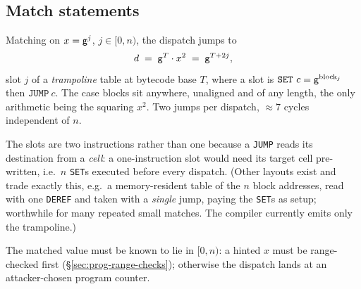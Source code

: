 \subsection{Match statements}\label{sec:prog-match}

Matching on $x=\mathsf{g}^{j}$, $j\in[0,n)$, the dispatch jumps to
\[
  d \;=\; \mathsf{g}^{T}\cdot x^{2} \;=\; \mathsf{g}^{T+2j},
\]
slot $j$ of a \emph{trampoline} table at bytecode base $T$, where a slot is $\texttt{SET}\ c=\gen^{\mathrm{block}_j}$ then $\texttt{JUMP}\ c$. The case blocks sit anywhere, unaligned and of any length, the only arithmetic being the squaring $x^{2}$. Two jumps per dispatch, $\approx7$ cycles independent of $n$.

The slots are two instructions rather than one because a \texttt{JUMP} reads its destination from a \emph{cell}: a one-instruction slot would need its target cell pre-written, i.e.\ $n$ \texttt{SET}s executed before every dispatch. (Other layouts exist and trade exactly this, e.g.\ a memory-resident table of the $n$ block addresses, read with one \texttt{DEREF} and taken with a \emph{single} jump, paying the \texttt{SET}s as setup; worthwhile for many repeated small matches. The compiler currently emits only the trampoline.)

The matched value must be known to lie in $[0,n)$: a hinted $x$ must be range-checked first (\S\ref{sec:prog-range-checks}); otherwise the dispatch lands at an attacker-chosen program counter.
